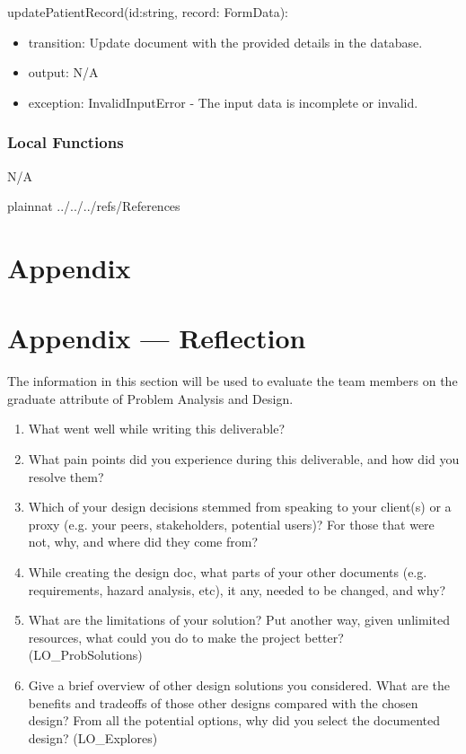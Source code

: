 \documentclass[12pt, titlepage]{article}
\begin{document}
\noindent updatePatientRecord(id:string, record: FormData):
\begin{itemize}
\item transition: Update document with the provided details in the database.
\item output: N/A
\item exception: InvalidInputError - The input data is incomplete or invalid.
\end{itemize}

\subsubsection{Local Functions}

N/A

\newpage


 {plainnat}
 {../../../refs/References}

\newpage

\section{Appendix} \label{Appendix}


\newpage{}

\section*{Appendix --- Reflection}


The information in this section will be used to evaluate the team members on the
graduate attribute of Problem Analysis and Design.



\begin{enumerate}
  \item What went well while writing this deliverable? 
  \item What pain points did you experience during this deliverable, and how
    did you resolve them?
  \item Which of your design decisions stemmed from speaking to your client(s)
  or a proxy (e.g. your peers, stakeholders, potential users)? For those that
  were not, why, and where did they come from?
  \item While creating the design doc, what parts of your other documents (e.g.
  requirements, hazard analysis, etc), it any, needed to be changed, and why?
  \item What are the limitations of your solution?  Put another way, given
  unlimited resources, what could you do to make the project better? (LO\_ProbSolutions)
  \item Give a brief overview of other design solutions you considered.  What
  are the benefits and tradeoffs of those other designs compared with the chosen
  design?  From all the potential options, why did you select the documented design?
  (LO\_Explores)
\end{enumerate}
\end{document}
